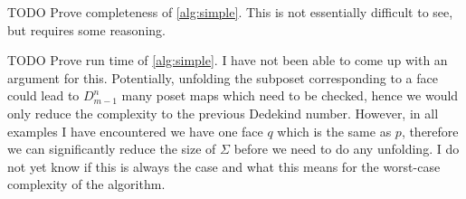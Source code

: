 \documentclass[11pt]{article}
\theoremstyle{definition}
\newcommand{\todo}[1]{
  \begin{tcolorbox}
    TODO {#1} 
  \end{tcolorbox}
}
\begin{document}


\todo{Prove completeness of \autoref{alg:simple}. This is not essentially difficult to
  see, but requires some reasoning.}

\todo{Prove run time of \autoref{alg:simple}. I have not been able to come up
  with an argument for this. Potentially, unfolding the subposet corresponding
  to a face could lead to $D_{m-1}^n$ many poset maps which need to be checked,
  hence we would only reduce the complexity to the previous Dedekind number.
  However, in all examples I have encountered we have one face $q$ which is the
  same as $p$, therefore we can significantly reduce the size of $\Sigma$ before
we need to do any unfolding. I do not yet know if this is always the case and
what this means for the worst-case complexity of the algorithm. }
\end{document}

